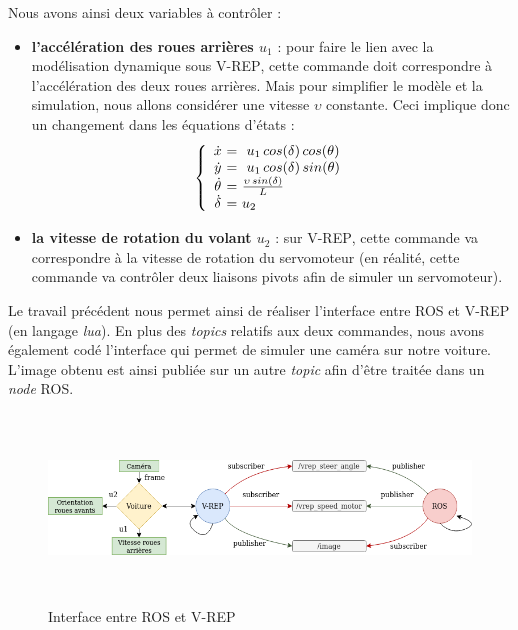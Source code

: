 \documentclass[12pt, openany]{report}
\begin{document}
Nous avons ainsi deux variables à contrôler : 
\begin{itemize}[label=\textbullet, font=\small]
    \item \textbf{l’accélération des roues arrières $u_1$} : pour faire le lien avec la modélisation dynamique sous \textsc{V-REP}, cette commande doit correspondre à l'accélération des deux roues arrières. Mais pour simplifier le modèle et la simulation, nous allons considérer une vitesse $\upsilon$ constante. Ceci implique donc un changement dans les équations d'états :
            $$\left \{
            \begin{array}{c @{=} l}
                \dot{x}\ & \ \ u_1\, cos(\delta)\, cos(\theta) \\
                \dot{y}\ & \ \ u_1\, cos(\delta)\, sin(\theta) \\
                \dot{\theta}\ & \ \frac{\upsilon\, sin(\delta)}{L} \\
                \dot{\delta}\ & \ u_2 
            \end{array}
            \right. $$
    \item \textbf{la vitesse de rotation du volant $u_2$} : sur \textsc{V-REP}, cette commande va correspondre à la vitesse de rotation du servomoteur (en réalité, cette commande va contrôler deux liaisons pivots afin de simuler un servomoteur).\\
\end{itemize}

Le travail précédent nous permet ainsi de réaliser l'interface entre \textsc{ROS} et \textsc{V-REP} (en langage \textit{lua}). En plus des \textit{topics} relatifs aux deux commandes, nous avons également codé l'interface qui permet de simuler une caméra sur notre voiture. L'image obtenu est ainsi publiée sur un autre \textit{topic} afin d'être traitée dans un \textit{node} \textsc{ROS}.\\

\begin{figure}[H]
     \centering
     \includegraphics[width=\textwidth, height = 5cm]{topics.png}
     \caption{Interface entre ROS et V-REP}
     \label{fig:interface}
\end{figure}
\end{document}
